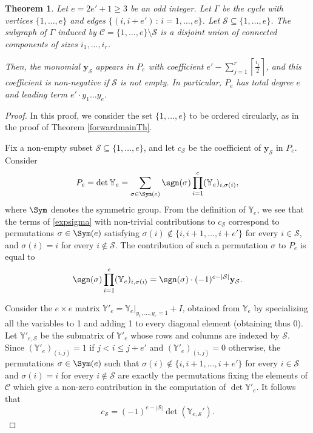 \documentclass[11pt,twoside]{amsart}
\newcommand{\YY}{\mathbb Y}
\newcommand{\cS}{\mathcal{S}}
\newcommand{\cC}{\mathcal{C}}
\def\by{{\mathbf y}}
\newtheorem{thm}[Theorem]{Theorem}
\theoremstyle{definition}
\numberwithin{equation}{section}
\begin{document}
\begin{thm}\label{ThmCascadePolynomial}
Let $e = 2e'+1\geq 3$ be an odd  integer.
Let $\Gamma$ be the cycle with vertices $\{1,\ldots,e\}$ and edges $\{(i, i+e')\,:\, i = 1, \ldots, e\}$.  
Let $\cS \subseteq \{1,\ldots,e\}$.
The subgraph  of $\Gamma$  induced by  
 $\cC=\{1,\ldots,e\} \setminus \mathcal{S}$
is a disjoint union of connected components 
of sizes $i_1,\ldots,i_r$. 


Then,
the monomial $\by_\cS$ appears in $P_e$ with coefficient $e'-\sum_{j=1}^r \left \lceil \frac{i_j}{2} \right \rceil$, and this coefficient is non-negative if $\cS$ is not empty.
In particular, $P_e$ has total degree $e$ and leading term  $e' \cdot y_1\ldots y_e$.
\end{thm}
\begin{proof}
In this proof, 
we consider the set $\{1, \ldots, e\}$  to be ordered circularly,
as in the proof of Theorem \ref{forwardmainTh}.

Fix a non-empty subset $\cS \subseteq \{1,\ldots,e\}$, and let $c_\cS$ be the coefficient of  $\by_\cS$ in $P_e$. Consider
\begin{equation}\label{expsigma}
    P_e = \det \YY_e = \sum_{\sigma \in 
    \Sym(e)} \sgn(\sigma) \prod_{i=1}^e (\YY_e)_{i,\sigma(i)},
\end{equation}
where $\Sym$ denotes the symmetric group.
From the definition of $\YY_e$, we see that the terms of  \eqref{expsigma} with non-trivial contributions to $c_\cS$ correspond to permutations $\sigma \in \Sym(e)$ satisfying $\sigma(i) \not \in \{i,i+1,\ldots,i+e'\}$ for every $i \in \cS$, and $\sigma(i)=i$ for every $i \notin \cS$.
The contribution of such a permutation $\sigma$ to $P_e$ is equal to
 $$ \sgn(\sigma) \prod_{i=1}^e (\YY_e)_{i,\sigma(i)} = \sgn(\sigma) \cdot (-1)^{e-|\cS|} \by_\cS.$$
 
Consider the $e \times e$ matrix $\YY'_e = \YY_e|_{y_1, \ldots,y_e=1}+ I$, 
 obtained from $\YY_e$ by specializing  all the variables to 1 and adding 1 to every diagonal element (obtaining thus 0).
Let $\YY'_{e,\cS}$ be the submatrix of $\YY'_e$ whose rows and columns are indexed by $\cS$.  Since  $(\YY'_e)_{(i,j)} = 1$ if $j < i  \le j+e'$ and $(\YY'_e)_{(i,j)}=0$ otherwise, the permutations $\sigma \in \Sym(e)$ such that $\sigma(i) \notin \{i,i+1,\ldots,i+e'\}$ for every $i \in \cS$ and $\sigma(i)=i$ for every $i \notin \cS$ are exactly the permutations fixing the elements of $\cC$ which give  a non-zero contribution in the computation of $\det \YY'_e$. 
It follows that
\begin{equation}\label{minorcoeff}
 c_\cS = (-1)^{e-|\cS|} \det(\YY_{e,\cS}').
\end{equation}


\end{proof}
\end{document}
